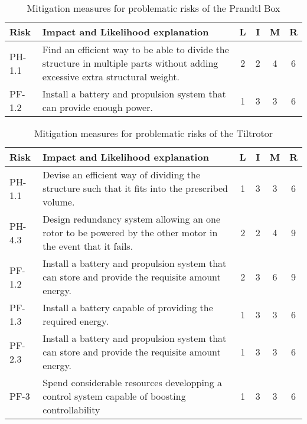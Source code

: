 \begin{table}[H]
    \centering
    \caption{Mitigation measures for problematic risks of the Prandtl Box}
    \label{tab:miti_pran_box}
    \begin{tabularx}{\textwidth}{l L *{4}{c}}
    \toprule
    Risk            & Impact and Likelihood explanation                             & L & I & M & R
    \\ \midrule
    PH-1.1          & Find an efficient way to be able to divide the structure in multiple parts without adding excessive extra structural weight.                             & 2 & 2 & 4 & 6
    \\ \hdashline
    PF-1.2          & Install a battery and propulsion system that can provide enough power.       & 1 & 3 & 3 & 6
    \\ \bottomrule
    \end{tabularx}
\end{table}

\iffalse
\begin{table}
    \centering
    \caption{Mitigation measures for problematic risks of the Tiltrotor}
    \label{tab:miti_tilt}
    \begin{tabularx}{\textwidth}{l L *{4}{c} }
    \toprule
    Risk            & Impact and Likelihood explanation                             & L & I & M & R
    \\ \midrule
    PH-1.1          & Devise an efficient way of dividing the structure such that it fits into the prescribed volume.     & 1 & 3 & 3 & 6
    \\ \hdashline
    PH-4.3          & Design redundancy system allowing an one rotor to be powered by the other motor in the event that it fails. & 2 & 2 & 4 & 9
    \\ \hdashline
    PF-1.2          & Install a battery and propulsion system that can store and provide the requisite amount energy.              & 2 & 3 & 6 & 9
    \\ \hdashline
    PF-1.3          & Install a battery capable of providing the required energy.                                                 & 1 & 3 & 3 & 6
    \\ \hdashline
    PF-2.3          & Install a battery and propulsion system that can store and provide the requisite amount energy.              & 1 & 3 & 3 & 6
    \\ \hdashline
    PF-3            & Spend considerable resources developping a control system capable of boosting controllability               & 1 & 3 & 3 & 6
    \\ \bottomrule
    \end{tabularx}
\end{table}




